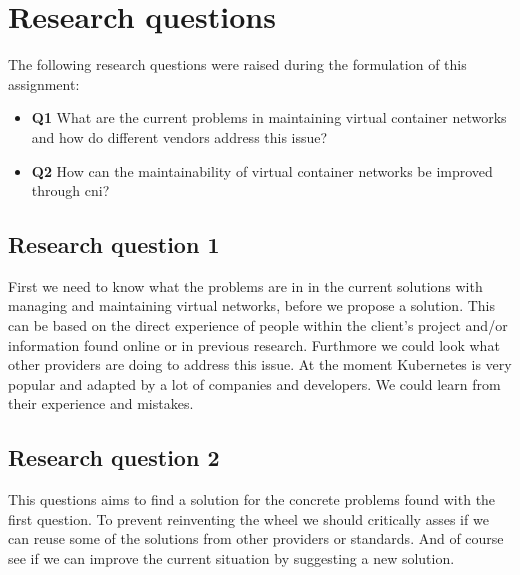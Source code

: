 \section{Research questions}
The following research questions were raised during the formulation of this assignment:
\begin{itemize}
    \item \textbf{Q1} What are the current problems in maintaining virtual container networks and how do different vendors address this issue?
    \item \textbf{Q2} How can the maintainability of virtual container networks be improved through \gls{cni}?   
\end{itemize}

\subsection{Research question 1}
First we need to know what the problems are in in the current solutions with managing and maintaining virtual networks, before we propose a solution. This can be based on the direct experience of people within the client's project and/or information found online or in previous research. Furthmore we could look what other providers are doing to address this issue. At the moment Kubernetes is very popular and adapted by a lot of companies and developers. We could learn from their experience and mistakes.

\subsection{Research question 2}
This questions aims to find a solution for the concrete problems found with the first question. To prevent reinventing the wheel we should critically asses if we can reuse some of the solutions from other providers or standards. And of course see if we can improve the current situation by suggesting a new solution.
